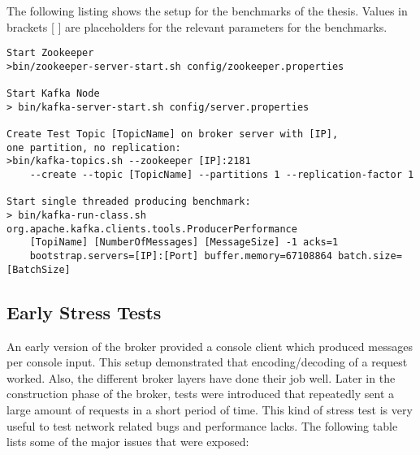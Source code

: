 The following listing shows the setup for the benchmarks of the thesis. Values
in brackets [ ] are placeholders for the relevant parameters for the
benchmarks.

\begin{verbatim}
Start Zookeeper
>bin/zookeeper-server-start.sh config/zookeeper.properties

Start Kafka Node 
> bin/kafka-server-start.sh config/server.properties

Create Test Topic [TopicName] on broker server with [IP], 
one partition, no replication: 
>bin/kafka-topics.sh --zookeeper [IP]:2181 
    --create --topic [TopicName] --partitions 1 --replication-factor 1

Start single threaded producing benchmark: 
> bin/kafka-run-class.sh org.apache.kafka.clients.tools.ProducerPerformance 
    [TopiName] [NumberOfMessages] [MessageSize] -1 acks=1 
    bootstrap.servers=[IP]:[Port] buffer.memory=67108864 batch.size=[BatchSize]
\end{verbatim}





\newpage
\subsection{Early Stress Tests}

An early version of the broker provided a console client which produced messages
per console input. This setup demonstrated that encoding/decoding of a request
worked. Also, the different broker layers have done their job well.  Later in the
construction phase of the broker, tests were introduced that repeatedly sent a large amount of
requests in a short period of time. This kind of stress test is
very useful to test network related bugs and performance lacks. The following
table lists some of the major issues that were exposed: 

